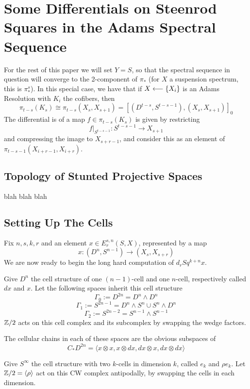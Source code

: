 \section{Some Differentials on Steenrod Squares in the Adams Spectral Sequence}

For the rest of this paper we will set $Y=S$, so that the spectral sequence in question will converge to the 2-component of $\pi_*$ (for $X$ a suspension spectrum, this is $\pi_*^s$).  In this special case, we have that if $X\longleftarrow \{X_i\}$ is an Adams Resolution with $K_i$ the cofibers, then 
\[\pi_{t-s}(K_s)\cong \pi_{t-s}(X_s,X_{s+1}) = [(D^{t-s},S^{t-s-1}),(X_s,X_{s+1})]_0\]
The differential is of a map $f\in \pi_{t-s}(K_s)$ is given by restricting 
\[f|_{S^{t-s-1}}:S^{t-s-1}\to X_{s+1}\]
 and compressing the image to $X_{s+r-1}$, and consider this as an element of $\pi_{t-s-1}(X_{i+r-1},X_{i+r})$. 



\subsection{Topology of Stunted Projective Spaces}


blah blah blah

\subsection{Setting Up The Cells}
\label{sec:setup}

Fix $n,s,k,r$ and an element $x\in E_r^{s,n}(S,X)$, represented by a map
\[x: (D^n,S^{n-1})\to (X_s,X_{s+r})\]
We are now ready to begin the long hard computation of $d_rSq^{k+n}x$.  

Give $D^n$ the cell structure of one $(n-1)$-cell and one $n$-cell, respectively called $dx$ and $x$.
Let the following spaces inherit this cell structure
\[\Gamma_0:=D^{2n}=D^n\wedge D^n\]
\[\Gamma_1:=S^{2n-1}=D^n\wedge S^n\cup S^n\wedge D^n\]
\[\Gamma_2:=S^{2n-2}=S^{n-1}\wedge S^{n-1}\]
$\mathbb{Z}/2$ acts on this cell complex and its subcomplex by swapping the wedge factors.  

The cellular chains in each of these spaces are the obvious subspaces of
\[C_*D^{2n} = \langle x\otimes x,x\otimes dx,dx\otimes x,dx\otimes dx\rangle\]

Give $S^\infty$ the cell structure with two $k$-cells in dimension $k$, called $e_k$ and $\rho e_k$.
Let $\mathbb{Z}/2=\langle \rho \rangle$ act on this CW complex antipodally, by swapping the cells in each dimension.  

